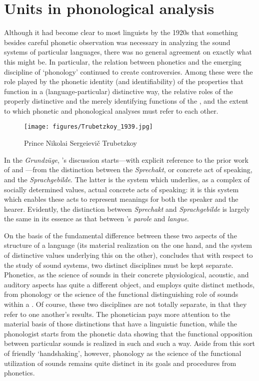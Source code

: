 \section{Units in phonological analysis}
\label{sec:units-phon-analysis}

Although it had become clear to most linguists by the 1920s that
something besides careful phonetic observation was necessary in
analyzing the sound systems of particular languages, there was no
general agreement on exactly what this might be. In particular, the
relation between phonetics and the emerging discipline of `phonology'
continued to create controversies. Among these were the role played by
the phonetic identity (and identifiability) of the properties that
function in a (language-particular) distinctive way, the relative
roles of the properly distinctive and the merely identifying functions
of the , and the extent to which phonetic and phonological
analyses must refer to each other.

\begin{wrapfigure}[16]{l}{.35\textwidth}
  \texttt{[image: figures/Trubetzkoy\_1939.jpg]}
  \caption{Prince Nikolai Sergeievič Trubetzkoy}
  \label{fig:ch.prague_trubetzkoy_1939}
\end{wrapfigure}
In the \textsl{Grundzüge}, {\Trubetzkoy}'s discussion starts—with explicit
reference to the prior work of {\Saussure} and {\DeCourtenay}—from
the distinction between the \emph{Sprechakt}, or concrete act of
speaking, and the \emph{Sprachgebilde}. The latter is the system which
underlies, as a complex of socially determined values, actual concrete
acts of speaking: it is this system which enables these acts to
represent meanings for both the speaker and the hearer. Evidently, the
distinction between \emph{Sprechakt} and \emph{Sprachgebilde} is
largely the same in its essence as that between {\Saussure}'s
\emph{parole} and \emph{langue}.

On the basis of the fundamental difference between these two aspects
of the structure of a language (its material realization on the one
hand, and the system of distinctive values underlying this on the
other), {\Trubetzkoy} concludes that with respect to the study of sound
systems, two distinct disciplines must be kept separate. Phonetics, as
the science of sounds in their concrete physiological, acoustic, and
auditory aspects has quite a different object, and employs quite
distinct methods, from phonology or the science of the functional
distinguishing role of sounds within a . Of course,
these two disciplines are not totally separate, in that they refer to
one another's results. The phonetician pays more attention to the
material basis of those distinctions that have a linguistic function,
while the phonologist starts from the phonetic data showing that the
functional opposition between particular sounds is realized in such
and such a way. Aside from this sort of friendly `handshaking',
however, phonology as the science of the functional utilization of
sounds remains quite distinct in its goals and procedures from
phonetics.


